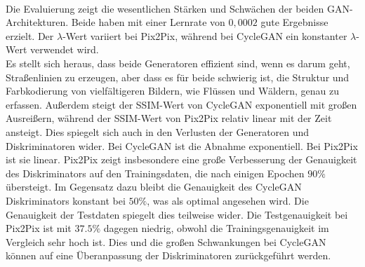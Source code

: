 \\\newline
Die Evaluierung zeigt die wesentlichen Stärken und Schwächen der beiden GAN-Architekturen. Beide haben mit einer Lernrate von $0,0002$ gute Ergebnisse erzielt. Der $\lambda$-Wert variiert bei Pix2Pix, während bei CycleGAN ein konstanter $\lambda$-Wert verwendet wird.
\\
Es stellt sich heraus, dass beide Generatoren effizient sind, wenn es darum geht, Straßenlinien zu erzeugen, aber dass es für beide schwierig ist, die Struktur und Farbkodierung von vielfältigeren Bildern, wie Flüssen und Wäldern, genau zu erfassen. Außerdem steigt der SSIM-Wert von CycleGAN exponentiell mit großen Ausreißern, während der SSIM-Wert von Pix2Pix relativ linear mit der Zeit ansteigt. Dies spiegelt sich auch in den Verlusten der Generatoren und Diskriminatoren wider. Bei CycleGAN ist die Abnahme exponentiell. Bei Pix2Pix ist sie linear. 
Pix2Pix zeigt insbesondere eine große Verbesserung der Genauigkeit des Diskriminators auf den Trainingsdaten, die nach einigen Epochen $90\%$ übersteigt. Im Gegensatz dazu bleibt die Genauigkeit des CycleGAN Diskriminators konstant bei $50\%$, was als optimal angesehen wird. Die Genauigkeit der Testdaten spiegelt dies teilweise wider.
Die Testgenauigkeit bei Pix2Pix ist mit $37.5\%$ dagegen niedrig, obwohl die Trainingsgenauigkeit im Vergleich sehr hoch ist. Dies und die großen Schwankungen bei CycleGAN können auf eine Überanpassung der Diskriminatoren zurückgeführt werden.
\\

